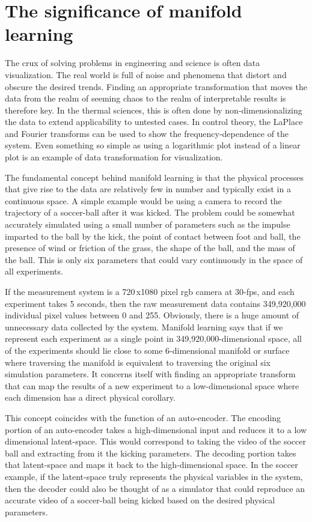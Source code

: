 \documentclass{article}
\begin{document}
\section{The significance of manifold learning}
The crux of solving problems in engineering and science is often data visualization. The real world is full of noise and phenomena that distort and obscure the desired trends. Finding an appropriate transformation that moves the data from the realm of seeming chaos to the realm of interpretable results is therefore key. In the thermal sciences, this is often done by non-dimensionalizing the data to extend applicability to untested cases. In control theory, the LaPlace and Fourier transforms can be used to show the frequency-dependence of the system. Even something so simple as using a logarithmic plot instead of a linear plot is an example of data transformation for visualization.

The fundamental concept behind manifold learning is that the physical processes that give rise to the data are relatively few in number and typically exist in a continuous space. A simple example would be using a camera to record the trajectory of a soccer-ball after it was kicked. The problem could be somewhat accurately simulated using a small number of parameters such as the impulse imparted to the ball by the kick, the point of contact between foot and ball, the presence of wind or friction of the grass, the shape of the ball, and the mass of the ball. This is only six parameters that could vary continuously in the space of all experiments. 

If the measurement system is a 720\,x1080 pixel rgb camera at 30-fps, and each experiment takes 5 seconds, then the raw measurement data contains 349,920,000 individual pixel values between 0 and 255. Obviously, there is a huge amount of unnecessary data collected by the system. Manifold learning says that if we represent each experiment as a single point in 349,920,000-dimensional space, all of the experiments should lie close to some 6-dimensional manifold or surface where traversing the manifold is equivalent to traversing the original six simulation parameters. It concerns itself with finding an appropriate transform that can map the results of a new experiment to a low-dimensional space where each dimension has a direct physical corollary. 

This concept coincides with the function of an auto-encoder. The encoding portion of an auto-encoder takes a high-dimensional input and reduces it to a low dimensional latent-space. This would correspond to taking the video of the soccer ball and extracting from it the kicking parameters. The decoding portion takes that latent-space and maps it back to the high-dimensional space. In the soccer example, if the latent-space truly represents the physical variables in the system, then the decoder could also be thought of as a simulator that could reproduce an accurate video of a soccer-ball being kicked based on the desired physical parameters. 
\end{document}

